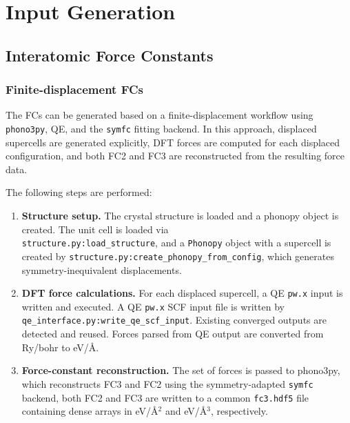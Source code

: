 \chapter{Input Generation}
\label{ch:input_gen}


\section{Interatomic Force Constants}
\label{sec:ifc}


\subsection{Finite-displacement FCs}
\label{sec:finite_displacement}

The FCs can be generated based on a finite-displacement workflow
using \texttt{phono3py}, QE, and the \texttt{symfc} fitting backend.  In this
approach, displaced supercells are generated explicitly, DFT forces are
computed for each displaced configuration, and both FC2 and FC3 are
reconstructed from the resulting force data.

The following steps are performed:
\begin{enumerate}
  \item \textbf{Structure setup.}
        The crystal structure is loaded and a phonopy object is
        created. The unit cell is loaded via \\
        \texttt{structure.py:load\_structure}, and a
        \texttt{Phonopy} object with a supercell is
        created by
        \texttt{structure.py:create\_phonopy\_from\_config}, which
        generates symmetry-inequivalent displacements.
  \item \textbf{DFT force calculations.}
        For each displaced supercell, a QE \texttt{pw.x}
        input is written and executed.  A QE \texttt{pw.x} SCF input
        file is written by\\
        \texttt{qe\_interface.py:write\_qe\_scf\_input}.  Existing
        converged outputs are detected and reused.  Forces parsed from
        QE output are converted from Ry/bohr to eV/\AA.

  \item \textbf{Force-constant reconstruction.}
        The set of forces is passed to phono3py, which reconstructs FC3
        and FC2 using the symmetry-adapted \texttt{symfc} backend, both
        FC2 and FC3 are written to a common \texttt{fc3.hdf5} file
        containing dense arrays in eV/\AA$^2$ and eV/\AA$^3$,
        respectively.
\end{enumerate}

